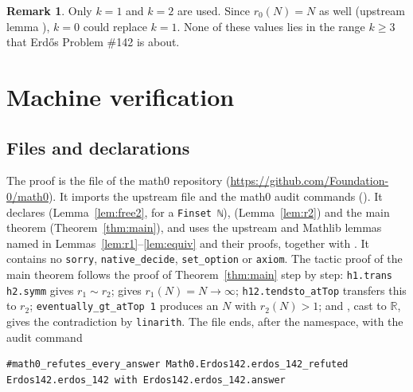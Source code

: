 \documentclass[11pt]{amsart}
\theoremstyle{plain}
\theoremstyle{definition}
\newtheorem{remark}[theorem]{Remark}
\newcommand{\R}{\mathbb{R}}
\begin{document}
\begin{remark}
Only $k=1$ and $k=2$ are used. Since $r_0(N)=N$ as well (upstream lemma ), $k=0$ could replace $k=1$. None of these values lies in the range $k\ge 3$ that Erd\H{o}s Problem \#142 is about.
\end{remark}

\section{Machine verification}\label{sec:lean}

\subsection*{Files and declarations}
The proof is the file  of the math0 repository (\url{https://github.com/Foundation-0/math0}). It imports the upstream file  and the math0 audit commands (). It declares  (Lemma~\ref{lem:free2}, for a \texttt{Finset ℕ}),  (Lemma~\ref{lem:r2}) and the main theorem  (Theorem~\ref{thm:main}), and uses the upstream and Mathlib lemmas named in Lemmas~\ref{lem:r1}--\ref{lem:equiv} and their proofs, together with . It contains no \texttt{sorry}, \texttt{native\_decide}, \texttt{set\_option} or \texttt{axiom}. The tactic proof of the main theorem follows the proof of Theorem~\ref{thm:main} step by step: \texttt{h1.trans h2.symm} gives $r_1\sim r_2$;  gives $r_1(N)=N\to\infty$; \texttt{h12.tendsto\_atTop} transfers this to $r_2$; \texttt{eventually\_gt\_atTop 1} produces an $N$ with $r_2(N)>1$; and , cast to $\R$, gives the contradiction by \texttt{linarith}. The file ends, after the namespace, with the audit command
\begin{lstlisting}
#math0_refutes_every_answer Math0.Erdos142.erdos_142_refuted Erdos142.erdos_142 with Erdos142.erdos_142.answer
\end{lstlisting}
\end{document}
